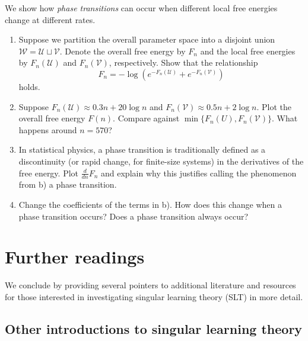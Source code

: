 \documentclass[11pt]{article}
\newcommand{\W}{\mathcal{W}}
\newcommand{\U}{\mathcal{U}}
\newcommand{\V}{\mathcal{V}}
\begin{document}
\begin{exercise}\label{ex:phase-transitions} We show how \emph{phase transitions} can occur when different local free energies change at different rates.
  \begin{enumerate}
    \item Suppose we partition the overall parameter space into a disjoint union $\W = \U \sqcup \V$. Denote the overall free energy by $F_n$ and the local free energies by $F_n(\U)$ and $F_n(\V)$, respectively. Show that the relationship
    \[
    F_n = -\log(e^{-F_n(\U)} + e^{-F_n(\V)})
    \]
    holds.
    
    \item Suppose $F_n(\U) \approx 0.3n + 20 \log n$ and $F_n(\V) \approx 0.5n + 2 \log n$. Plot the overall free energy $F(n)$. Compare against $\min\{F_ n(U), F_n(\V)\}$. What happens around $n = 570$?
    \item In statistical physics, a phase transition is traditionally defined as a discontinuity (or rapid change, for finite-size systems) in the derivatives of the free energy. Plot $\frac{d}{dn}F_n$ and explain why this justifies calling the phenomenon from b) a phase transition.
    \item Change the coefficients of the terms in b). How does this change when a phase transition occurs? Does a phase transition always occur?
    \end{enumerate}
\end{exercise}

\clearpage
\section{Further readings}
\label{sec:readings}

We conclude by providing several pointers to additional literature and resources for those interested in investigating singular learning theory (SLT) in more detail.

\subsection{Other introductions to singular learning theory}
\end{document}
